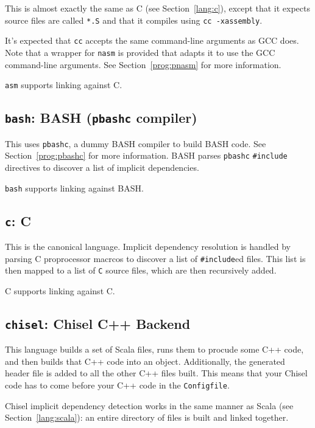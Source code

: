 \documentclass{article}
\begin{document}
This is almost exactly the same as C (see Section~\ref{lang:c}),
except that it expects source files are called \texttt{*.S} and that
it compiles using \texttt{cc -xassembly}.

It's expected that \texttt{cc} accepts the same command-line arguments
as GCC does.  Note that a wrapper for \texttt{nasm} is provided that
adapts it to use the GCC command-line arguments.  See
Section~\ref{prog:pnasm} for more information.

\texttt{asm} supports linking against C.

\subsection{\texttt{bash}: BASH (\texttt{pbashc} compiler) \label{lang:bash}}

This uses \texttt{pbashc}, a dummy BASH compiler to build BASH code.
See Section~\ref{prog:pbashc} for more information.  BASH parses
\texttt{pbashc} \texttt{\#include} directives to discover a list of
implicit dependencies.

\texttt{bash} supports linking against BASH.

\subsection{\texttt{c}: C \label{lang:c}}

This is the canonical language.  Implicit dependency resolution is
handled by parsing C proprocessor macrcos to discover a list of
\texttt{\#include}ed files.  This list is then mapped to a list of
\texttt{C} source files, which are then recursively added.

C supports linking against C.

\subsection{\texttt{chisel}: Chisel C++ Backend \label{chisel}}

This language builds a set of Scala files, runs them to procude some
C++ code, and then builds that C++ code into an object.  Additionally,
the generated header file is added to all the other C++ files built.
This means that your Chisel code has to come before your C++ code in
the \texttt{Configfile}.

Chisel implicit dependency detection works in the same manner as Scala
(see Section~\ref{lang:scala}): an entire directory of files is built
and linked together.
\end{document}
